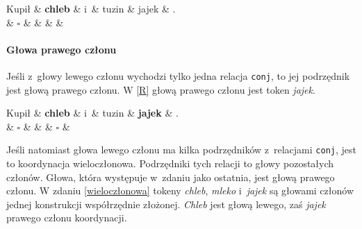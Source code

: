 \begin{exe}
\ex \label{L}
\begin{dependency}[baseline=0.9ex]
\begin{deptext}[column sep=1em, row sep=.1ex]
Kupił \& \textbf{chleb} \& i~\& tuzin \& jajek \& .  \\ 
 \& \textbf{$\square$} \&  \&  \& \&  \\ 
\end{deptext}
\end{dependency}
\end{exe}

\paragraph{Głowa prawego członu}

Jeśli z~głowy lewego członu wychodzi tylko jedna relacja \texttt{conj}, to jej podrzędnik jest głową prawego członu. W \eqref{R} głową prawego członu jest token \textit{jajek}.

\begin{exe}
\ex \label{R}
\begin{dependency}[baseline=0.9ex]
\begin{deptext}[column sep=1em, row sep=.1ex]
Kupił \& \textbf{chleb} \& i~\& tuzin \& \textbf{jajek} \& .  \\ 
 \& \textbf{$\square$} \&  \&  \& \textbf{$\square$} \&  \\ 
\end{deptext}
\end{dependency}
\end{exe}

Jeśli natomiast głowa lewego członu ma kilka podrzędników z~relacjami \texttt{conj}, jest to koordynacja wieloczłonowa. Podrzędniki tych relacji to głowy pozostałych członów. Głowa, która występuje w~zdaniu jako ostatnia, jest głową prawego członu. W zdaniu \eqref{wieloczłonowa} tokeny \textit{chleb}, \textit{mleko} i~\textit{jajek} są głowami członów jednej konstrukcji współrzędnie złożonej. \textit{Chleb} jest głową lewego, zaś \textit{jajek} prawego członu koordynacji.

